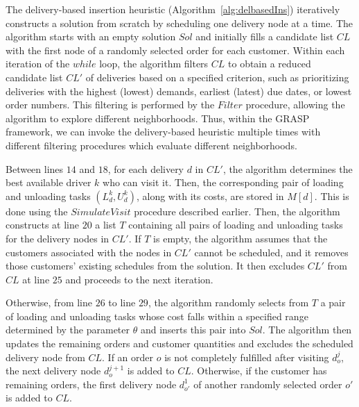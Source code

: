 \documentclass[authoryear,preprint,review,11pt]{elsarticle}
\begin{document}
The delivery-based insertion heuristic (Algorithm~\ref{alg:delbasedIns}) iteratively constructs a solution from scratch by scheduling one delivery node at a time. The algorithm starts with an empty solution $Sol$ and initially fills a candidate list $CL$ with the first node of a randomly selected order for each customer. Within each iteration of the $while$ loop, the algorithm filters $CL$ to obtain a reduced candidate list $CL'$ of deliveries based on a specified criterion, such as prioritizing deliveries with the highest (lowest) demands, earliest (latest) due dates, or lowest order numbers. This filtering is performed by the $Filter$ procedure, allowing the algorithm to explore different neighborhoods. Thus, within the GRASP framework, we can invoke the delivery-based heuristic multiple times with different filtering procedures which evaluate different neighborhoods.

Between lines $14$ and $18$, for each delivery $d$ in $CL'$, the algorithm determines the best available driver $k$ who can visit it. Then, the corresponding pair of loading and unloading tasks $(L^k_d, U^k_d)$, along with its costs, are stored in $M[d]$. This is done using the $SimulateVisit$ procedure described earlier. Then, the algorithm constructs at line $20$ a list $T$ containing all pairs of loading and unloading tasks for the delivery nodes in $CL'$.
If $T$ is empty, the algorithm assumes that the customers associated with the nodes in $CL'$ cannot be scheduled, and it removes those customers' existing schedules from the solution. It then excludes $CL'$ from $CL$ at line $25$ and proceeds to the next iteration.

Otherwise, from line $26$ to line $29$, the algorithm randomly selects from $T$ a pair of loading and unloading tasks whose cost falls within a specified range determined by the parameter $\theta$ and inserts this pair into $Sol$. The algorithm then updates the remaining orders and customer quantities and excludes the scheduled delivery node from $CL$. If an order $o$ is not completely fulfilled after visiting $d^j_{o}$, the next delivery node $d^{j+1}_{o}$ is added to $CL$.  Otherwise, if the customer has remaining orders, the first delivery node $d^{1}_{o'}$ of another randomly selected order $o'$ is added to $CL$.
\end{document}
